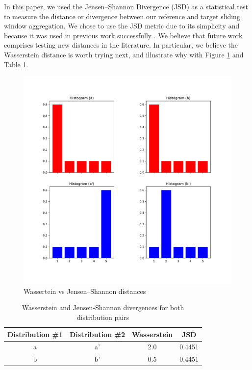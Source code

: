\documentclass[sigconf]{acmart}
\begin{document}
In this paper, we used the Jensen–Shannon Divergence (JSD) as a statistical test to measure the distance or divergence between our reference and target sliding window aggregation. We chose to use the JSD metric due to its simplicity and because it was used in previous work successfully \cite{SAMM}. We believe that future work comprises testing new distances in the literature. In particular, we believe the Wasserstein distance is worth trying next, and illustrate why with Figure \ref{fig:wasserteinvsjsd} and Table \ref{tbl:wassertein-vs-jsd}. 
\begin{figure}[!htb]
    \begin{center}
      \includegraphics[scale=0.3]{figures/wasserstein-vs-jsd.pdf}
      \caption{Wassertein vs Jensen–Shannon distances}
      \label{fig:wasserteinvsjsd}
    \end{center}
\end{figure}
\begin{table}[!htb]
    \begin{center}
        \begin{tabular}{|c|c|c|c|}
        \hline
        \textbf{Distribution \#1} & \textbf{Distribution \#2} & \textbf{Wasserstein} & \textbf{JSD} \\ \hline
        a                         & a'                        & 2.0                         & 0.4451                         \\ \hline
        b                         & b'                        & 0.5                         & 0.4451                         \\ \hline
        \end{tabular}
    \end{center}
    \caption[Wasserstein and Jensen-Shannon divergences output comparison]{Wasserstein and Jensen-Shannon divergences for both distribution pairs}
    \label{tbl:wassertein-vs-jsd}
\end{table}
\end{document}
